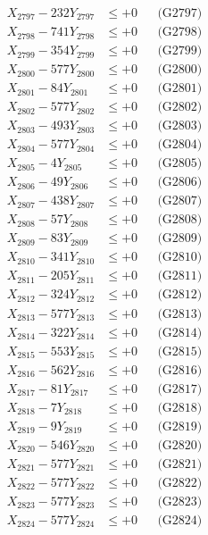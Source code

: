 \documentclass[a4paper,10pt]{article}
\begin{document}
{\begin{align}
X_{2797} - 232Y_{2797} &\leq +0 && \text{(G2797)} \\
X_{2798} - 741Y_{2798} &\leq +0 && \text{(G2798)} \\
X_{2799} - 354Y_{2799} &\leq +0 && \text{(G2799)} \\
X_{2800} - 577Y_{2800} &\leq +0 && \text{(G2800)} \\
\allowbreak
X_{2801} - 84Y_{2801} &\leq +0 && \text{(G2801)} \\
X_{2802} - 577Y_{2802} &\leq +0 && \text{(G2802)} \\
X_{2803} - 493Y_{2803} &\leq +0 && \text{(G2803)} \\
X_{2804} - 577Y_{2804} &\leq +0 && \text{(G2804)} \\
X_{2805} - 4Y_{2805} &\leq +0 && \text{(G2805)} \\
X_{2806} - 49Y_{2806} &\leq +0 && \text{(G2806)} \\
X_{2807} - 438Y_{2807} &\leq +0 && \text{(G2807)} \\
X_{2808} - 57Y_{2808} &\leq +0 && \text{(G2808)} \\
X_{2809} - 83Y_{2809} &\leq +0 && \text{(G2809)} \\
X_{2810} - 341Y_{2810} &\leq +0 && \text{(G2810)} \\
\allowbreak
X_{2811} - 205Y_{2811} &\leq +0 && \text{(G2811)} \\
X_{2812} - 324Y_{2812} &\leq +0 && \text{(G2812)} \\
X_{2813} - 577Y_{2813} &\leq +0 && \text{(G2813)} \\
X_{2814} - 322Y_{2814} &\leq +0 && \text{(G2814)} \\
X_{2815} - 553Y_{2815} &\leq +0 && \text{(G2815)} \\
X_{2816} - 562Y_{2816} &\leq +0 && \text{(G2816)} \\
X_{2817} - 81Y_{2817} &\leq +0 && \text{(G2817)} \\
X_{2818} - 7Y_{2818} &\leq +0 && \text{(G2818)} \\
X_{2819} - 9Y_{2819} &\leq +0 && \text{(G2819)} \\
X_{2820} - 546Y_{2820} &\leq +0 && \text{(G2820)} \\
\allowbreak
X_{2821} - 577Y_{2821} &\leq +0 && \text{(G2821)} \\
X_{2822} - 577Y_{2822} &\leq +0 && \text{(G2822)} \\
X_{2823} - 577Y_{2823} &\leq +0 && \text{(G2823)} \\
X_{2824} - 577Y_{2824} &\leq +0 && \text{(G2824)} \\

\end{align}}
\end{document}
